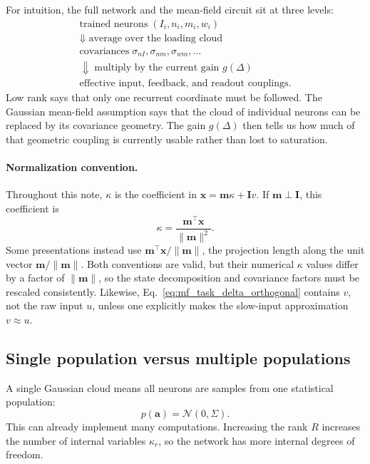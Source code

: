\documentclass[11pt]{article}
\newcommand{\vx}{\mathbf{x}}
\newcommand{\vm}{\mathbf{m}}
\newcommand{\vI}{\mathbf{I}}
\begin{document}
For intuition, the full network and the mean-field circuit sit at three levels:
\[
  \begin{array}{c}
  \text{trained neurons}\;(I_i,n_i,m_i,w_i)
  \\[0.5em]
  \Downarrow\;\text{average over the loading cloud}
  \\[0.5em]
  \text{covariances}\;\sigma_{nI},\sigma_{nm},\sigma_{wm},\ldots
  \\[0.5em]
  \Downarrow\;\text{multiply by the current gain }g(\Delta)
  \\[0.5em]
  \text{effective input, feedback, and readout couplings.}
  \end{array}
\]
Low rank says that only one recurrent coordinate must be followed. The Gaussian
mean-field assumption says that the cloud of individual neurons can be replaced
by its covariance geometry. The gain $g(\Delta)$ then tells us how much of that
geometric coupling is currently usable rather than lost to saturation.

\paragraph{Normalization convention.}
Throughout this note, $\kappa$ is the coefficient in
$\vx=\vm\kappa+\vI v$. If $\vm\perp\vI$, this coefficient is
\begin{equation}
  \kappa
  =
  \frac{\vm^\top\vx}{\lVert\vm\rVert^2}.
  \label{eq:mf_task_kappa_coefficient}
\end{equation}
Some presentations instead use
$\vm^\top\vx/\lVert\vm\rVert$, the projection length along the unit vector
$\vm/\lVert\vm\rVert$. Both conventions are valid, but their numerical
$\kappa$ values differ by a factor of $\lVert\vm\rVert$, so the state
decomposition and covariance factors must be rescaled consistently. Likewise,
Eq.~\eqref{eq:mf_task_delta_orthogonal} contains $v$, not the raw input $u$,
unless one explicitly makes the slow-input approximation $v\approx u$.

\subsection{Single population versus multiple populations}

A single Gaussian cloud means all neurons are samples from one statistical
population:
\[
  p(\mathbf{a}) = \mathcal{N}(0,\Sigma).
\]
This can already implement many computations. Increasing the rank $R$ increases
the number of internal variables $\kappa_r$, so the network has more internal
degrees of freedom.
\end{document}
